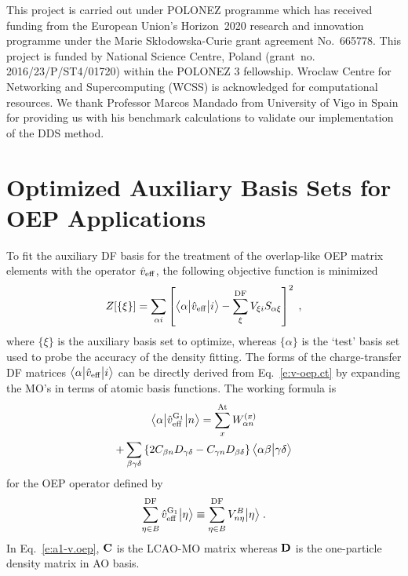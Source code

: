 \documentclass[aip,jcp,amsmath,amssymb,reprint,floatfix]{revtex4-1}
\begin{document}

\begin{acknowledgments}
This project is carried out under POLONEZ programme which has received funding from the European Union's
Horizon~2020 research and innovation programme under the Marie Sk{\l}odowska-Curie grant agreement 
No.~665778. This project is funded by National Science Centre, Poland 
(grant~no. 2016/23/P/ST4/01720) within the POLONEZ 3 fellowship.
Wroclaw Centre for Networking and Supercomputing (WCSS) is acknowledged for
computational resources.
We thank Professor Marcos Mandado from University of Vigo in Spain
for providing us with his benchmark calculations to validate our implementation
of the DDS method.
\end{acknowledgments}

\appendix

\section{Optimized Auxiliary Basis Sets for OEP Applications\label{a:auxiliary-basis}}

To fit the auxiliary DF basis for the treatment of the overlap\hyp{}like
OEP matrix elements with the operator $\hat{v}_{\rm eff}$, 
the following objective function is minimized
%
\begin{equation} \label{e:a1-obj}
 Z[\{\xi\}] = \sum_{\alpha i} \left[ 
     \tBraKet{\alpha}{\hat{v}_{\rm eff}}{i} - 
     \sum_{\xi}^{\rm DF} V_{\xi i} S_{\alpha \xi} 
    \right]^2 \;,
\end{equation}
%
where $\{\xi\}$ is the auxiliary basis set to optimize, whereas $\{\alpha\}$
is the `test' basis set used to probe the accuracy of the density fitting.
The forms of the %
charge\hyp{}transfer DF matrices $\tBraKet{\alpha}{\hat{v}_{\rm eff}}{i}$
can be directly derived 
from Eq.~\eqref{e:v-oep.ct}
by expanding the MO's in terms of atomic basis functions. The working formula
is %
%
\begin{multline} \label{e:a1-v.oep}
   \tBraKet{\alpha}{\hat{v}_{\rm eff}^{{\rm G}_1}}{n} 
     = \sum_{x}^{\rm At} W_{\alpha n}^{(x)}   \\
       + \sum_{\beta\gamma\delta} 
           \left\{
             2 C_{\beta n} D_{\gamma\delta} - C_{\gamma n} D_{\beta \delta}
           \right\}
           \BraKet{\alpha\beta}{\gamma\delta}
\end{multline}
%
for the OEP operator defined by 
%
\begin{equation}
 \sum_{\eta\in B}^{\rm DF} \hat{v}_{\rm eff}^{{\rm G}_1} \Ket{\eta} \equiv 
 \sum_{\eta\in B}^{\rm DF} V^B_{n\eta} \Ket{\eta} \;.
\end{equation}
%
In Eq.~\eqref{e:a1-v.oep}, ${\bf C}$ is the LCAO\hyp{}MO matrix whereas ${\bf D}$
is the one\hyp{}particle density matrix in AO basis.
\end{document}
